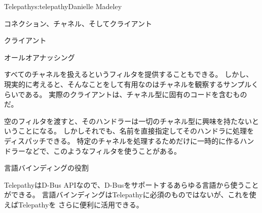 \begin{aosachapter}{Telepathy}{s:telepathy}{Danielle Madeley}
\begin{aosasect1}{コネクション、チャネル、そしてクライアント}
\begin{aosasect2}{クライアント}
\begin{aosabox}{オールオアナッシング}

すべてのチャネルを扱えるというフィルタを提供することもできる。
しかし、現実的に考えると、そんなことをして有用なのはチャネルを観察するサンプルくらいである。
実際のクライアントは、チャネル型に固有のコードを含むものだ。

空のフィルタを渡すと、そのハンドラーは一切のチャネル型に興味を持たないということになる。
しかしそれでも、名前を直接指定してそのハンドラに処理をディスパッチできる。
特定のチャネルを処理するためだけに一時的に作るハンドラーなどで、このようなフィルタを使うことがある。

\end{aosabox}

\end{aosasect2}

\end{aosasect1}

\begin{aosasect1}{言語バインディングの役割}

TelepathyはD-Bus APIなので、D-Busをサポートするあらゆる言語から使うことができる。
言語バインディングはTelepathyに必須のものではないが、これを使えばTelepathyを
さらに便利に活用できる。


\end{aosasect1}
\end{aosachapter}
